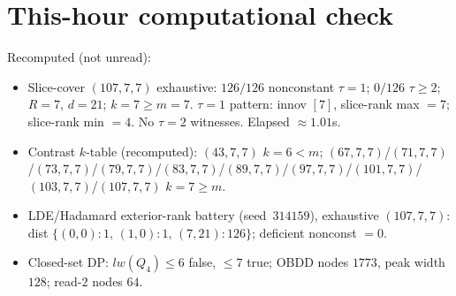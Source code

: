 \documentclass[11pt]{article}
\begin{document}
\section*{This-hour computational check}
Recomputed (not unread):
\begin{itemize}
\item Slice-cover $(107,7,7)$ exhaustive: $126/126$ nonconstant $\tau{=}1$;
  $0/126$ $\tau{\ge}2$; $R{=}7$, $d{=}21$; $k{=}7{\ge}m{=}7$.
  $\tau{=}1$ pattern: innov $[7]$, slice-rank max $=7$; slice-rank min $=4$.
  No $\tau{=}2$ witnesses. Elapsed $\approx1.01$s.
\item Contrast $k$-table (recomputed): $(43,7,7)$ $k{=}6{<}m$;
  $(67,7,7)$/$(71,7,7)$/$(73,7,7)$/$(79,7,7)$/$(83,7,7)$/$(89,7,7)$/$(97,7,7)$/$(101,7,7)$/$(103,7,7)$/$(107,7,7)$ $k{=}7{\ge}m$.
\item LDE/Hadamard exterior-rank battery (seed~$314159$), exhaustive $(107,7,7)$:
  dist $\{(0,0){:}1,\,(1,0){:}1,\,(7,21){:}126\}$; deficient nonconst $=0$.
\item Closed-set DP: $lw(Q_4)\le6$ false, $\le7$ true; OBDD nodes $1773$, peak width $128$;
  read-$2$ nodes $64$.
\end{itemize}
\end{document}
